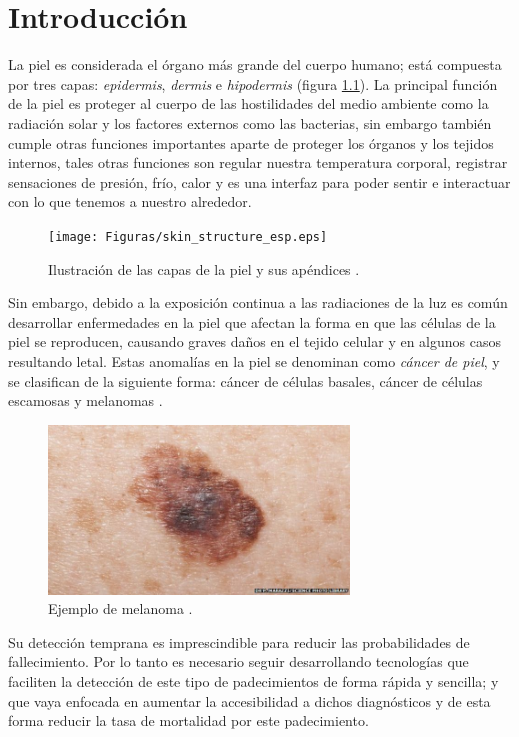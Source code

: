 
\chapter{Introducción}

La piel es considerada el órgano más grande del cuerpo humano; está compuesta por tres capas: \emph{\gls{epidermis}}, \emph{\gls{dermis}} e \emph{\gls{hipodermis}} (figura \ref{fig:skin1_jpg}). La principal función de la piel es proteger al cuerpo de las hostilidades del medio ambiente como la radiación solar y los factores externos como las bacterias, sin embargo también cumple otras funciones importantes aparte de proteger los órganos y los tejidos internos, tales otras funciones son regular nuestra temperatura corporal, registrar sensaciones de presión, frío, calor y es una interfaz para poder sentir e interactuar con lo que tenemos a nuestro alrededor.

\begin{figure}[h!]
    \texttt{[image: Figuras/skin\_structure\_esp.eps]}
    \centering
    \caption{Ilustración de las capas de la piel y sus apéndices \citep{skin_1}.}
    \label{fig:skin1_jpg}
\end{figure}

Sin embargo, debido a la exposición continua a las radiaciones de la luz es común desarrollar enfermedades en la piel que afectan la forma en que las células de la piel se reproducen, causando graves daños en el tejido celular y en algunos casos resultando letal. Estas anomalías en la piel se denominan como \emph{cáncer de piel}, y se clasifican de la siguiente forma: cáncer de células basales, cáncer de células escamosas y melanomas \citep{cancer_org}.

\begin{figure}[h!]
    \includegraphics[width=80mm]{Figuras/skin_cancer_bbc.jpg}
    \centering
    \caption{Ejemplo de melanoma \citep{cancer_img_1}.}
    \label{fig:can_jpg}
\end{figure}

 Su detección temprana es imprescindible para reducir las probabilidades de fallecimiento. Por lo tanto es necesario seguir desarrollando tecnologías que faciliten la detección de este tipo de padecimientos de forma rápida y sencilla; y que vaya enfocada en aumentar la accesibilidad a dichos diagnósticos y de esta forma reducir la tasa de mortalidad por este padecimiento.

